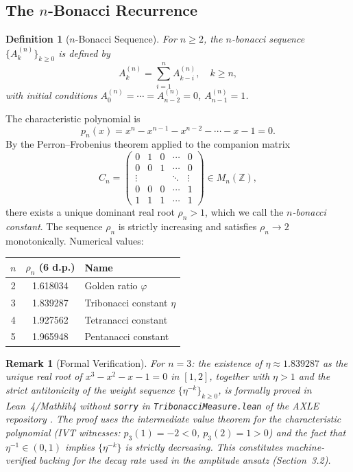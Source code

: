 \documentclass[12pt,a4paper]{article}
\newtheorem{definition}{Definition}
\newtheorem{remark}{Remark}
\begin{document}
\subsection{The $n$-Bonacci Recurrence}

\begin{definition}[$n$-Bonacci Sequence]
For $n \geq 2$, the $n$-bonacci sequence $\{A_k^{(n)}\}_{k \geq 0}$ is
defined by
\[
  A_k^{(n)} = \sum_{i=1}^{n} A_{k-i}^{(n)}, \quad k \geq n,
\]
with initial conditions $A_0^{(n)} = \cdots = A_{n-2}^{(n)} = 0$,
$A_{n-1}^{(n)} = 1$.
\end{definition}

The characteristic polynomial is
\[
  p_n(x) = x^n - x^{n-1} - x^{n-2} - \cdots - x - 1 = 0.
\]
By the Perron--Frobenius theorem applied to the companion matrix
\[
C_n = \begin{pmatrix}
0 & 1 & 0 & \cdots & 0 \\
0 & 0 & 1 & \cdots & 0 \\
\vdots & & & \ddots & \vdots \\
0 & 0 & 0 & \cdots & 1 \\
1 & 1 & 1 & \cdots & 1
\end{pmatrix} \in M_n(\mathbb{Z}),
\]
there exists a unique dominant real root $\rho_n > 1$, which we call the
\emph{$n$-bonacci constant}. The sequence $\rho_n$ is strictly increasing
and satisfies $\rho_n \to 2$ monotonically. Numerical values:

\begin{center}
\begin{tabular}{ccl}
\toprule
$n$ & $\rho_n$ (6 d.p.) & Name \\
\midrule
2 & 1.618034 & Golden ratio $\varphi$ \\
3 & 1.839287 & Tribonacci constant $\eta$ \\
4 & 1.927562 & Tetranacci constant \\
5 & 1.965948 & Pentanacci constant \\
\bottomrule
\end{tabular}
\end{center}

\begin{remark}[Formal Verification]
For $n = 3$: the existence of $\eta \approx 1.839287$ as the unique real root
of $x^3 - x^2 - x - 1 = 0$ in $[1,2]$, together with $\eta > 1$ and the
strict antitonicity of the weight sequence $\{\eta^{-k}\}_{k \geq 0}$, is
formally proved in Lean~4/Mathlib4 without \texttt{sorry} in
\texttt{TribonacciMeasure.lean} of the AXLE repository \cite{AXLE2026}. The
proof uses the intermediate value theorem for the characteristic polynomial
(IVT witnesses: $p_3(1) = -2 < 0$, $p_3(2) = 1 > 0$) and the fact that
$\eta^{-1} \in (0,1)$ implies $\{\eta^{-k}\}$ is strictly decreasing. This
constitutes machine-verified backing for the decay rate used in the amplitude
ansatz (Section~3.2).
\end{remark}
\end{document}
